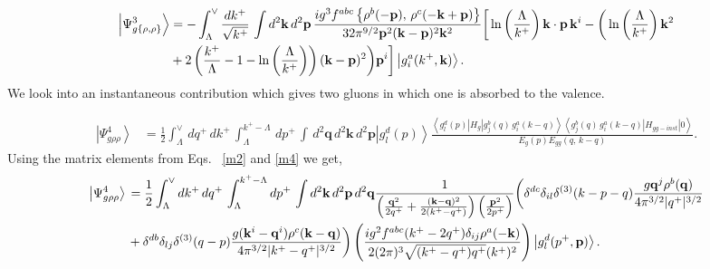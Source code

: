 \documentclass[aps,prd,amsmath,amssymb,nofootinbib]{revtex4-2}
\numberwithin{equation}{section}
\begin{document}
\begin{align}\label{tworho2}
\left|\Psi_{g\{\rho,\rho\}}^{3}\right\rangle & = -\int_{\Lambda}^{\vee}\frac{dk^{+}}{\sqrt{k^{+}}}\,\int d^{2}\mathbf{k}\, d^{2}\mathbf{p}\,\frac{ig^{3}f^{abc}\left\{ \rho^{b}(-\mathbf{p}),\,\rho^{c}(-\mathbf{k}+\mathbf{p})\right\} }{32\pi^{9/2}\mathbf{p}^{2}(\mathbf{k}-\mathbf{p})^{2}\mathbf{k}^{2}}\bigg[\ln\left(\frac{\Lambda}{k^{+}}\right)\mathbf{k}\cdot \mathbf{p}\,\mathbf{k}^{i}-\bigg(\ln\left(\frac{\Lambda}{k^{+}}\right)\mathbf{k}^{2}\notag \\ & +2\left(\frac{k^{+}}{\Lambda}-1-\ln\left(\frac{\Lambda}{k^{+}}\right)\right)(\mathbf{k}-\mathbf{p})^{2}\bigg)\mathbf{p}^{i}\bigg]\left|g_{i}^{a}(k^{+},\mathbf{k})\right\rangle.
\end{align}
\pagebreak 
We look into an instantaneous contribution which gives two gluons in which one is absorbed to the valence.  
\begin{figure}[h]
    \label{fig:7}
\end{figure}
\begin{align} \label{gfour}
\left|\Psi_{g\rho\rho}^{4}\right\rangle & =\frac{1}{2}\int_{\Lambda}^{\vee}\, dq^{+}\, dk^{+}\,\int_{\Lambda}^{k^{+}-\Lambda}\, dp^{+}\,\int\, d^{2}\mathbf{q}\, d^{2}\mathbf{k}\, d^{2}\mathbf{p}\left|g_{l}^{d}(p)\right\rangle \frac{\left\langle g_{l}^{d}(p)\left|H_{g}\right|g_{j}^{b}(q)\, g_{i}^{a}(k-q)\right\rangle \left\langle g_{j}^{b}(q)\, g_{i}^{a}(k-q)\left|H_{gg-inst}\right|0\right\rangle }{E_{g}(p)E_{gg}(q,\, k-q)}.
\end{align}
Using the matrix elements from Eqs.~ \eqref{m2} and \eqref{m4} we get,
 \begin{align}\label{inst4}
\left|\Psi_{g\rho\rho}^{4}\right\rangle \,& = \frac{1}{2}\int_{\Lambda}^{\vee}dk^{+}\,dq^{+}\,\int_{\Lambda}^{k^{+}-\Lambda}dp^{+}\, \int d^{2}\mathbf{k}\, d^{2}\mathbf{p}\, d^{2}\mathbf{q}\frac{1}{\left(\frac{\mathbf{q}^{2}}{2q^{+}}+\frac{(\mathbf{k}-\mathbf{q})^{2}}{2(k^{+}-q^{+})}\right)\left(\frac{\mathbf{p}^{2}}{2p^{+}}\right)}\bigg(\delta^{dc}\delta_{il}\delta^{(3)}(k-p-q)\frac{g\mathbf{q}^{j}\rho^{b}(\mathbf{q})}{4\pi^{3/2}|q^{+}|^{3/2}}\notag \\ & +\delta^{db}\delta_{lj}\delta^{(3)}(q-p)\frac{g(\mathbf{k}^{i}-\mathbf{q}^{i})\rho^{c}(\mathbf{k}-\mathbf{q})}{4\pi^{3/2}|k^{+}-q^{+}|^{3/2}}\bigg) \left(\frac{ig^{2}f^{abc}(k^{+}-2q^{+})\delta_{ij}\rho^{a}(-\mathbf{k})}{2(2\pi)^{3}\sqrt{(k^{+}-q^{+})q^{+}}(k^{+})^{2}}\right)\left|g_{l}^{d}(p^{+},\mathbf{p})\right\rangle .
\end{align}
\end{document}
